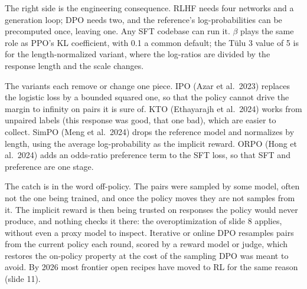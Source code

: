 \documentclass[11pt,letterpaper]{article}
\begin{document}
The right side is the engineering consequence. RLHF needs four networks and a generation loop; DPO needs two, and the reference's log-probabilities can be precomputed once, leaving one. Any SFT codebase can run it. $\beta$ plays the same role as PPO's KL coefficient, with 0.1 a common default; the Tülu 3 value of 5 is for the length-normalized variant, where the log-ratios are divided by the response length and the scale changes.

The variants each remove or change one piece. IPO (Azar et al.\ 2023) replaces the logistic loss by a bounded squared one, so that the policy cannot drive the margin to infinity on pairs it is sure of. KTO (Ethayarajh et al.\ 2024) works from unpaired labels (this response was good, that one bad), which are easier to collect. SimPO (Meng et al.\ 2024) drops the reference model and normalizes by length, using the average log-probability as the implicit reward. ORPO (Hong et al.\ 2024) adds an odds-ratio preference term to the SFT loss, so that SFT and preference are one stage.

The catch is in the word off-policy. The pairs were sampled by some model, often not the one being trained, and once the policy moves they are not samples from it. The implicit reward is then being trusted on responses the policy would never produce, and nothing checks it there: the overoptimization of slide 8 applies, without even a proxy model to inspect. Iterative or online DPO resamples pairs from the current policy each round, scored by a reward model or judge, which restores the on-policy property at the cost of the sampling DPO was meant to avoid. By 2026 most frontier open recipes have moved to RL for the same reason (slide 11).
\end{document}
